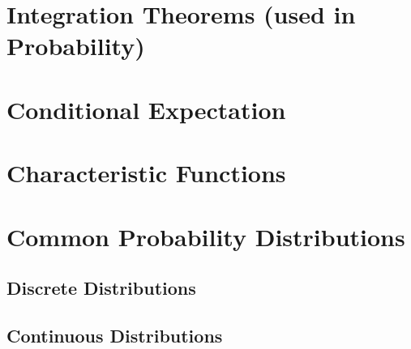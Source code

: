 \section{Integration Theorems (used in Probability)}







\section{Conditional Expectation}





\section{Characteristic Functions}





\section{Common Probability Distributions}

\subsection{Discrete Distributions}






\subsection{Continuous Distributions}








